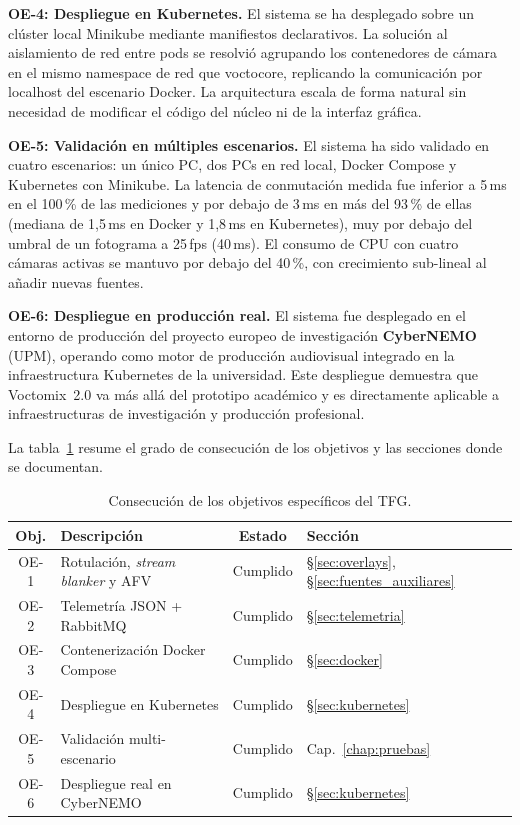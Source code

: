 \vspace{0.2cm}
\noindent\textbf{OE-4: Despliegue en Kubernetes.}
El sistema se ha desplegado sobre un clúster local Minikube mediante manifiestos
declarativos. La solución al aislamiento de red entre pods se resolvió agrupando los
contenedores de cámara en el mismo namespace de red que voctocore, replicando la
comunicación por localhost del escenario Docker. La arquitectura escala de forma
natural sin necesidad de modificar el código del núcleo ni de la interfaz gráfica.

\vspace{0.2cm}
\noindent\textbf{OE-5: Validación en múltiples escenarios.}
El sistema ha sido validado en cuatro escenarios: un único PC, dos PCs en red local,
Docker Compose y Kubernetes con Minikube. La latencia de conmutación medida fue
inferior a 5\,ms en el 100\,\% de las mediciones y por debajo de 3\,ms en más del
93\,\% de ellas (mediana de 1{,}5\,ms en Docker y 1{,}8\,ms en Kubernetes), muy por
debajo del umbral de un fotograma a 25\,fps (40\,ms).
El consumo de CPU con cuatro cámaras activas se mantuvo por debajo del 40\,\%, con
crecimiento sub-lineal al añadir nuevas fuentes.

\vspace{0.2cm}
\noindent\textbf{OE-6: Despliegue en producción real.}
El sistema fue desplegado en el entorno de producción del proyecto europeo de
investigación \textbf{CyberNEMO} (UPM), operando como motor de producción audiovisual
integrado en la infraestructura Kubernetes de la universidad. Este despliegue demuestra
que Voctomix~2.0 va más allá del prototipo académico y es directamente aplicable a
infraestructuras de investigación y producción profesional.

\vspace{0.4cm}
La tabla~\ref{tab:objetivos_cumplidos} resume el grado de consecución de los
objetivos y las secciones donde se documentan.

\begin{table}[H]
  \centering
  \caption{Consecución de los objetivos específicos del TFG.}
  \label{tab:objetivos_cumplidos}
  \begin{tabular}{|c|l|c|l|}
    \hline
    \textbf{Obj.} & \textbf{Descripción} & \textbf{Estado} & \textbf{Sección} \\
    \hline
    OE-1 & Rotulación, \textit{stream blanker} y AFV  & Cumplido & \S\ref{sec:overlays}, \S\ref{sec:fuentes_auxiliares} \\
    OE-2 & Telemetría JSON + RabbitMQ        & Cumplido & \S\ref{sec:telemetria} \\
    OE-3 & Contenerización Docker Compose    & Cumplido & \S\ref{sec:docker} \\
    OE-4 & Despliegue en Kubernetes          & Cumplido & \S\ref{sec:kubernetes} \\
    OE-5 & Validación multi-escenario        & Cumplido & Cap.~\ref{chap:pruebas} \\
    OE-6 & Despliegue real en CyberNEMO      & Cumplido & \S\ref{sec:kubernetes} \\
    \hline
  \end{tabular}
\end{table}

